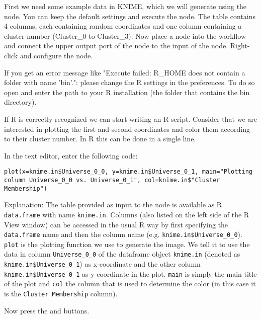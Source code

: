 \begin{task}
First we need some example data in KNIME, which we will generate using the  node. You can keep the default settings and execute the node. The table contains 4 columns, each containing random coordinates and one column containing a cluster number (Cluster\_0 to Cluster\_3). Now place a  node into the workflow and connect the upper output port of the  node to the input of the  node.
Right-click and configure the node.

If you get an error message like "Execute failed: R\_HOME does not contain a folder with name 'bin'.": please change the R settings in the preferences. To do so open  and enter the path to your R installation (the folder that contains the bin directory).

If R is correctly recognized we can start writing an R script. Consider that we are interested in plotting the first and second coordinates and color them according to their cluster number. In R this can be done in a single line.

In the  text editor, enter the following code:
\begin{lstlisting}
plot(x=knime.in$Universe_0_0, y=knime.in$Universe_0_1, main="Plotting column Universe_0_0 vs. Universe_0_1", col=knime.in$"Cluster Membership")
\end{lstlisting}
        
Explanation:
The table provided as input to the  node is available as R \texttt{data.frame} with name \texttt{knime.in}. Columns (also listed on the left side of the R View window) can be accessed in the usual R way by first specifying the \texttt{data.frame} name and then the column name (e.g. \texttt{knime.in\$Universe\_0\_0}).
\texttt{plot} is the plotting function we use to generate the image. We tell it to use the data in column \texttt{Universe\_0\_0} of the dataframe object \texttt{knime.in} (denoted as \texttt{knime.in\$Universe\_0\_1}) as x-coordinate and the other column \texttt{knime.in\$Universe\_0\_1} as y-coordinate in the plot. \texttt{main} is simply the main title of the plot and \texttt{col} the column that is used to determine the color (in this case it is the \texttt{Cluster Membership} column).

Now press the  and  buttons.
\end{task}

